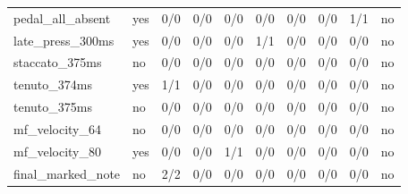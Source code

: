 \begin{tabular}{llrrrrrrrl}
pedal\_all\_absent & yes & 0/0 & 0/0 & 0/0 & 0/0 & 0/0 & 0/0 & 1/1 & no \\
late\_press\_300ms & yes & 0/0 & 0/0 & 0/0 & 1/1 & 0/0 & 0/0 & 0/0 & no \\
staccato\_375ms & no & 0/0 & 0/0 & 0/0 & 0/0 & 0/0 & 0/0 & 0/0 & no \\
tenuto\_374ms & yes & 1/1 & 0/0 & 0/0 & 0/0 & 0/0 & 0/0 & 0/0 & no \\
tenuto\_375ms & no & 0/0 & 0/0 & 0/0 & 0/0 & 0/0 & 0/0 & 0/0 & no \\
mf\_velocity\_64 & no & 0/0 & 0/0 & 0/0 & 0/0 & 0/0 & 0/0 & 0/0 & no \\
mf\_velocity\_80 & yes & 0/0 & 0/0 & 1/1 & 0/0 & 0/0 & 0/0 & 0/0 & no \\
final\_marked\_note & no & 2/2 & 0/0 & 0/0 & 0/0 & 0/0 & 0/0 & 0/0 & no \\
\hline
\end{tabular}
